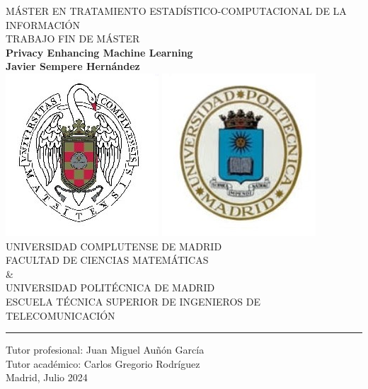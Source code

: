 \documentclass[a4paper,12pt]{article}
\begin{document}
\thispagestyle{empty}
\begin{center}

{MÁSTER EN TRATAMIENTO ESTADÍSTICO-COMPUTACIONAL DE LA INFORMACIÓN}\\[2em]
{\large TRABAJO FIN DE MÁSTER}\\[1.5em]
{\LARGE\bf Privacy Enhancing Machine Learning}\\[1.5em]
{\large\bf Javier Sempere Hernández}\\[5em]

\includegraphics[scale=0.5]{TECI_Escudo_UCM} \hspace{2cm}
\includegraphics[scale=0.5]{TECI_Escudo_UPM} \\[2.5em]

{UNIVERSIDAD COMPLUTENSE DE MADRID}\\[0.25em]
{\footnotesize FACULTAD DE CIENCIAS MATEMÁTICAS}\\[0.25em]
{\&}\\[0.25em]
{UNIVERSIDAD POLITÉCNICA DE MADRID}\\[0.25em]
{\footnotesize ESCUELA TÉCNICA SUPERIOR DE INGENIEROS DE TELECOMUNICACIÓN}\\[2em]

\noindent\rule{13.5cm}{0.4pt}\vspace{2em}

{Tutor profesional: Juan Miguel Auñón García}\\[1em]
{Tutor académico: Carlos Gregorio Rodríguez}\\[3em]
{Madrid, Julio 2024}
\end{center}
\end{document}
